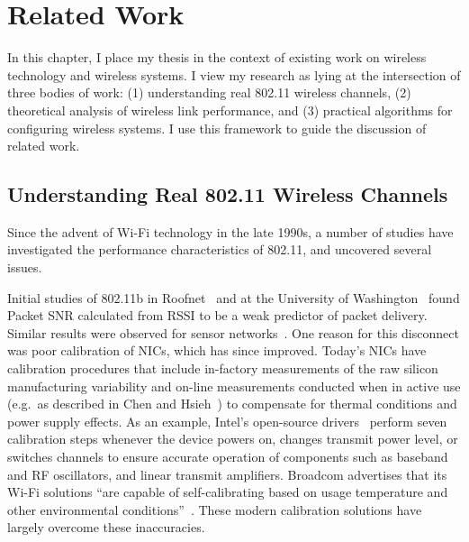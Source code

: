 \ifx\mainfile\undefined

\setcounter{chapter}{8} %
\fi

\cleardoublepage
\chapter{Related Work}
\label{chap:related}

In this chapter, I place my thesis in the context of existing work on wireless technology and wireless systems. I view my research as lying at the intersection of three bodies of work: (1) understanding real 802.11 wireless channels, (2) theoretical analysis of wireless link performance, and (3) practical algorithms for configuring wireless systems. I use this framework to guide the discussion of related work.

\section{Understanding Real 802.11 Wireless Channels}
Since the advent of Wi-Fi technology in the late 1990s, a number of studies have investigated the performance characteristics of 802.11, and uncovered several issues.

Initial studies of 802.11b in Roofnet~\cite{Aguayo_Roofnet} and at the University of Washington~\cite{Reis_interference} found Packet SNR calculated from RSSI to be a weak predictor of packet delivery. Similar results were observed for sensor networks~\cite{Zhao_sensys03}. One reason for this disconnect was poor calibration of NICs, which has since improved. Today's NICs have calibration procedures that include in-factory measurements of the raw silicon manufacturing variability and on-line measurements conducted when in active use (e.g.\ as described in Chen and Hsieh~\cite{Chen_IQcalib}) to compensate for thermal conditions and power supply effects. As an example, Intel's open-source drivers~\cite{iwlwifi} perform seven calibration steps whenever the device powers on, changes transmit power level, or switches channels to ensure accurate operation of components such as baseband and RF oscillators, and linear transmit amplifiers. Broadcom advertises that its Wi-Fi solutions ``are capable of self-calibrating based on usage temperature and other environmental conditions''~\cite{Broadcom_calib}. These modern calibration solutions have largely overcome these inaccuracies.

